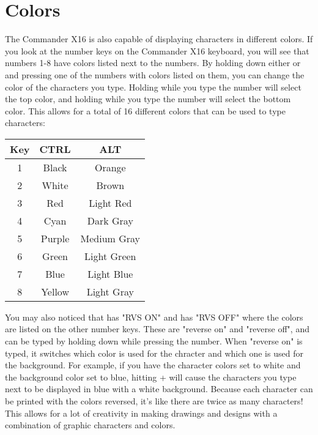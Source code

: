 \chapter*{Colors}

The Commander X16 is also capable of displaying characters in different colors.
If you look at the number keys on the Commander X16 keyboard, you will see that
numbers 1-8 have colors listed next to the numbers.  By holding down either
\altkey or \ctrlkey and pressing one of the numbers with colors listed on them,
you can change the color of the characters you type.  Holding \ctrlkey while
you type the number will select the top color, and holding \altkey while you
type the number will select the bottom color.  This allows for a total of 16
different colors that can be used to type characters:\\

\begin{tabular}{|c|c|c|}
	\hline
	Key & CTRL & ALT\\ \hline
	1 & Black & Orange \\ \hline
	2 & White & Brown \\ \hline
	3 & Red & Light Red \\ \hline
	4 & Cyan & Dark Gray\\ \hline
	5 & Purple & Medium Gray\\ \hline
	6 & Green & Light Green\\ \hline
	7 & Blue & Light Blue\\ \hline
	8 & Yellow & Light Gray\\ \hline
\end{tabular}

\vspace{16pt}

You may also noticed that  has "RVS ON" and  has "RVS OFF" where
the colors are listed on the other number keys.  These are "reverse on" and
"reverse off", and can be typed by holding down \ctrlkey while pressing the
number.  When "reverse on" is typed, it switches which color is used for the
chracter and which one is used for the background.  For example, if you have
the character colors set to white and the background color set to blue, hitting
\ctrlkey +  will cause the characters you type next to be displayed in
blue with a white background.  Because each character can be printed with the
colors reversed, it's like there are twice as many characters!  This allows for
a lot of creativity in making drawings and designs with a combination of
graphic characters and colors.\\

